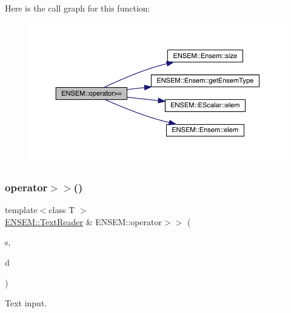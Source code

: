 Here is the call graph for this function\+:\nopagebreak
\begin{figure}[H]
\begin{center}
\leavevmode
\includegraphics[width=350pt]{d1/d9e/group__eensem_ga08b4c51fd25a40dd1d20e6138378a63d_cgraph}
\end{center}
\end{figure}
\mbox{\label{group__eensem_ga607184316d75a7cc8f6e0b082332832e}} 
\subsubsection{\texorpdfstring{operator$>$$>$()}{operator>>()}\hspace{0.1cm}{\footnotesize\ttfamily [1/4]}}
{\footnotesize\ttfamily template$<$class T $>$ \\
\mbox{\hyperlink{classENSEM_1_1TextReader}{E\+N\+S\+E\+M\+::\+Text\+Reader}} \& E\+N\+S\+E\+M\+::operator$>$$>$ (\begin{DoxyParamCaption}\item[{\mbox{\hyperlink{classENSEM_1_1TextReader}{E\+N\+S\+E\+M\+::\+Text\+Reader}} \&}]{s,  }\item[{\mbox{\hyperlink{classENSEM_1_1Ensem}{Ensem}}$<$ T $>$ \&}]{d }\end{DoxyParamCaption})\hspace{0.3cm}{\ttfamily [inline]}}



Text input. 

